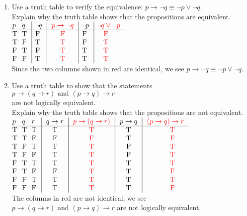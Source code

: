 \documentclass[11pt]{amsart}
\begin{document}
\begin{enumerate}
\begin{enumerate}
\end{enumerate}

\item  Use a truth table to verify  the  equivalence:
$p\longrightarrow \neg q\equiv \neg p\lor\neg q$.\\
Explain why the truth table shows that the propositions are equivalent.\\[10pt]
{\color{blue}
$\vbox{\offinterlineskip
\halign { \strut # & # & \vrule ~# & \vrule {\color{red} ~~#} & \vrule ~# & \vrule{\color{red}  ~#} \cr
$p$ & $q$ &  $\lnot q$ & $p \rightarrow \lnot q$ &  $\lnot p$ & $\neg q \lor \neg p$ \cr
\noalign{\hrule}
T   &  T   &  F & F  &  F  & \,F \cr
T   &  F   &  T & T  &  F  & \,T \cr
F   &  T   &  F & T  &  T  & \,T \cr
F   &  F   &  T & T  &  T  & \,T \cr
}}$\\[3pt]

Since the two columns shown in red are identical, we see $p\longrightarrow \lnot q\equiv \lnot p\lor \neg q$.
}\\[5pt]


\item Use a truth table to show that the statements $p\longrightarrow (q\longrightarrow r) \text{ and  }(p\longrightarrow q)\longrightarrow r$ \\
are not logically equivalent. \\
Explain why the truth table shows that the propositions are not equivalent.\\[10pt]
{\color{blue}
$\vbox{\offinterlineskip
\halign { \strut # & # & # & \vrule ~~# & \vrule {\color{red} ~~#} & \vrule ~~# & \vrule {\color{red} ~~#}  \cr
$p$ & $q$ & $r$ & $q\rightarrow r$ & $p\rightarrow (q\rightarrow r)$ & $p\rightarrow q$ & $(p \rightarrow q)\rightarrow r$ \cr
\noalign{\hrule}
T   &  T   &  T   &  T  &  T  & T &  T\cr
T   &  T   &  F   &  F  &  F   & T & F\cr
T   &  F   &  T   &  T  &  T   & F & T\cr
T   &  F   &  F   &  T  &  T   & F & T\cr
F   &  T   &  T   &  T  &  T  & T & T\cr
F   &  T   &  F   &  F  &  T  & T & F\cr
F   &  F   &  T   &  T  &  T  & T & T\cr
F   &  F   &  F   &  T  &  T  & T & F\cr
}}$\\[3pt]
The columns in red are not identical, we see $p\longrightarrow (q\longrightarrow r) \text{ and  }(p\longrightarrow q)\longrightarrow r$ are not logically equivalent. 
}\\[10pt]




\end{enumerate}
\end{document}
